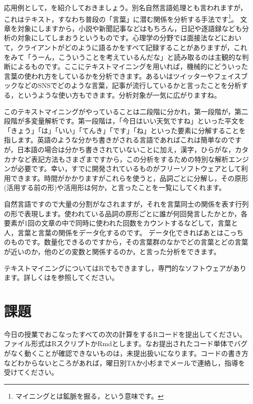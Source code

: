 \documentclass{ltjsbook}
\begin{document}
応用例として，を紹介しておきましょう。別名自然言語処理とも言われますが，これはテキスト，すなわち普段の「言葉」に潜む関係を分析する手法です\footnote{マイニングとは鉱脈を掘る，という意味です。}。
文章を対象にしますから，小説や新聞記事などはもちろん，日記や逐語録なども分析の対象にしてしまおうというものです。心理学の分野では面接法などにおいて，クライアントがどのように語るかをすべて記録することがありますが，これをみて「うーん，こういうことを考えているんだな」と読み取るのは主観的な判断によるものです。ここにテキストマイニングを用いれば，機械的にどういった言葉の使われ方をしているかを分析できます。あるいはツイッターやフェイスブックなどのSNSでどのような言葉，記事が流行しているかと言ったことを分析する，というような使い方もできます。分析対象が一気に広がりますね。

このテキストマイニングがやっていることは二段階に分かれ，第一段階が，第二段階が多変量解析です。第一段階は，「今日はいい天気ですね」といった平文を「きょう」「は」「いい」「てんき」「です」「ね」といった要素に分解することを指します。英語のような分かち書きがされる言語であればこれは簡単なのですが，日本語の場合は分かち書きされていないことに加え，漢字，ひらがな，カタカナなど表記方法もさまざまですから，この分析をするための特別な解析エンジンが必要です。幸い，すでに開発されているものがフリーソフトウェアとして利用できます。時間がかかりますがこれらを使うと，品詞ごとに分解し，その原形(活用する前の形)や活用形は何か，と言ったことを一覧にしてくれます。

自然言語ですので大量の分割がなされますが，それを言葉同士の関係を表す行列の形で表現します。使われている品詞の原形ごとに誰が何回発言したかとか，各要素が1回の文章の中で同時に使われた回数をカウントするなどして，言葉と人，言葉と言葉の関係をデータ化するのです。
データ化できればあとはこっちのものです。数量化できるのですから，その言葉群のなかでどの言葉とどの言葉が近いのか，他のどの変数と関係するのか，と言った分析をできます。

テキストマイニングについてはRでもできますし，専門的なソフトウェアがあります。詳しくは\textcite{Higuchu20200406}を参照してください。


\section{課題}
今日の授業でおこなったすべての次の計算をするRコードを提出してください。ファイル形式はRスクリプトかRmdとします。なお提出されたコード単体でバグがなく動くことが確認できないものは，未提出扱いになります。コードの書き方などわからないところがあれば，曜日別TAか小杉までメールで連絡し，指導を受けてください。
\end{document}
